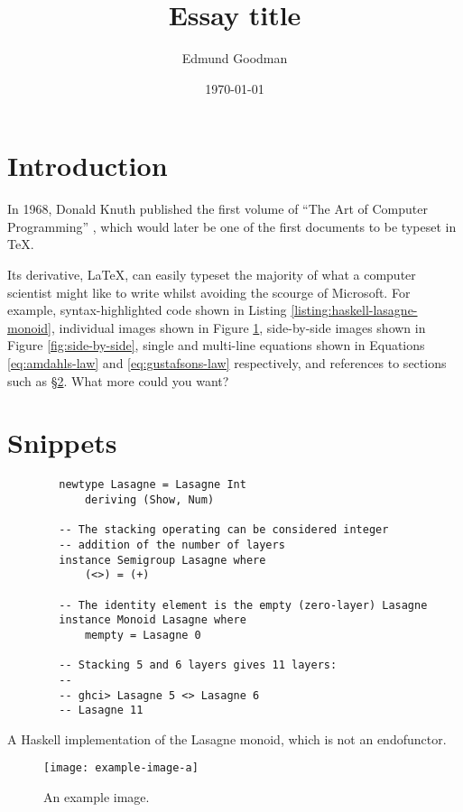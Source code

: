\documentclass[12pt]{article}
\title{Essay title}
\author{Edmund Goodman}
\date{\today}
\begin{document}
\maketitle

\section{Introduction}
\label{sec:introduction}

In 1968, Donald Knuth published the first volume of ``The Art of Computer Programming'' \cite{knuth1997art}, which would later be one of the first documents to be typeset in \TeX.

Its derivative, \LaTeX, can easily typeset the majority of what a computer scientist might like to write whilst avoiding the scourge of Microsoft. For example, syntax-highlighted code shown in Listing \ref{listing:haskell-lasagne-monoid}, individual images shown in Figure \ref{fig:example-image-a}, side-by-side images shown in Figure \ref{fig:side-by-side}, single and multi-line equations shown in Equations \ref{eq:amdahls-law} and \ref{eq:gustafsons-law} respectively, and references to sections such as §\ref{sec:snippets}. What more could you want?

\section{Snippets}
\label{sec:snippets}

\begin{listing}[H]
    \begin{verbatim}
        newtype Lasagne = Lasagne Int
            deriving (Show, Num)

        -- The stacking operating can be considered integer
        -- addition of the number of layers
        instance Semigroup Lasagne where
            (<>) = (+)

        -- The identity element is the empty (zero-layer) Lasagne
        instance Monoid Lasagne where
            mempty = Lasagne 0

        -- Stacking 5 and 6 layers gives 11 layers:
        --
        -- ghci> Lasagne 5 <> Lasagne 6
        -- Lasagne 11
    \end{verbatim}
    \caption{A Haskell implementation of the Lasagne monoid, which is not an endofunctor.}
    \label{listing:haskell-lasagne-monoid}
\end{listing}

\begin{figure}[H]
    \centering
    \texttt{[image: example-image-a]}
    \caption{An example image.}
    \label{fig:example-image-a}
\end{figure}
\end{document}
